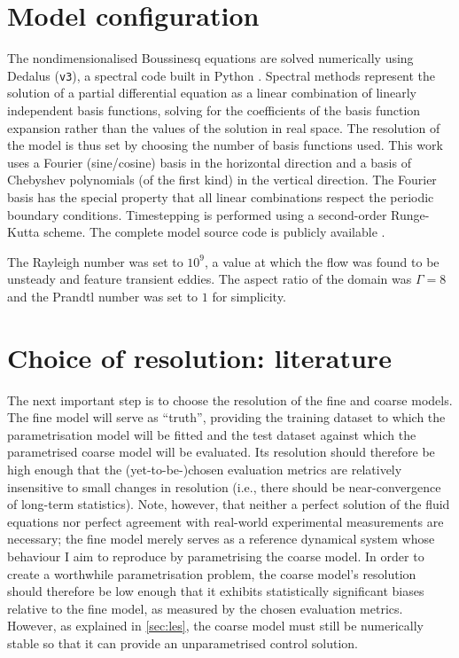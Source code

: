 \documentclass[../main.tex]{subfiles}
\begin{document}
\section{Model configuration}
The nondimensionalised Boussinesq equations
 are solved numerically using Dedalus
(\texttt{v3}), a spectral code built in Python \parencite{burns2020}. Spectral
methods represent the solution of a partial differential equation as a linear
combination of linearly independent basis functions, solving for the
coefficients of the basis function expansion rather than the values of the
solution in real space. The resolution of the model is thus set by choosing the
number of basis functions used. This work uses a Fourier (sine/cosine) basis in
the horizontal direction and a basis of Chebyshev polynomials (of the first
kind) in the vertical direction. The Fourier basis has the special property
that all linear combinations respect the periodic boundary conditions.
Timestepping is performed using a second-order Runge-Kutta scheme. The complete
model source code is publicly available .

The Rayleigh number was set to $10^9$, a value at which the flow was found to
be unsteady and feature transient eddies. The aspect ratio of the domain was
$\Gamma = 8$ and the Prandtl number was set to $1$ for simplicity.



\section{Choice of resolution: literature} \label{sec:resolution}
The next important step is to choose the resolution of the fine and coarse
models. The fine model will serve as ``truth'', providing the training dataset
to which the parametrisation model will be fitted and the test dataset against
which the parametrised coarse model will be evaluated. Its resolution should
therefore be high enough that the (yet-to-be-)chosen evaluation metrics are
relatively insensitive to small changes in resolution (i.e., there should be
near-convergence of long-term statistics). Note, however, that neither a
perfect solution of the fluid equations nor perfect agreement with real-world
experimental measurements are necessary; the fine model merely serves as a
reference dynamical system whose behaviour I aim to reproduce by parametrising
the coarse model. In order to create a worthwhile parametrisation problem, the
coarse model's resolution should therefore be low enough that it exhibits
statistically significant biases relative to the fine model, as measured by the
chosen evaluation metrics. However, as explained in \cref{sec:les}, the
coarse model must still be numerically stable so that it can provide an
unparametrised control solution.
\end{document}
